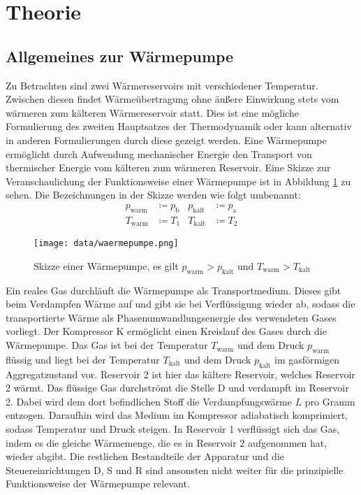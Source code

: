 \section{Theorie}
\label{sec:Theorie}
\subsection{Allgemeines zur Wärmepumpe}
Zu Betrachten sind zwei Wärmereservoirs mit verschiedener Temperatur.
Zwischen diesen findet Wärmeübertragung ohne äußere Einwirkung stets vom
wärmeren zum kälteren Wärmereservoir statt. Dies ist eine mögliche Formulierung des
zweiten Hauptsatzes der Thermodynamik oder kann alternativ in anderen Formulierungen
durch diese gezeigt werden. \newline
Eine Wärmepumpe ermöglicht durch Aufwendung mechanischer Energie den Transport von
thermischer Energie vom kälteren zum wärmeren Reservoir.
Eine Skizze zur Veranschaulichung der Funktionsweise einer Wärmepumpe ist in
Abbildung \ref{fig:waermepumpebild} zu sehen. Die Bezeichnungen in der Skizze werden
wie folgt umbenannt:
\begin{align*}
p_\text{warm} &\coloneqq p_\text{b} & p_\text{kalt} &\coloneqq p_\text{a} \\
T_\text{warm} &\coloneqq T_1 & T_\text{kalt} &\coloneqq T_2
\end{align*}

\begin{figure}[H]
  \centering
  \texttt{[image: data/waermepumpe.png]}
  \caption{Skizze einer Wärmepumpe, es gilt $p_\text{warm} > p_\text{kalt}$ und $T_\text{warm} > T_\text{kalt}$ \cite{Versuchsanleitung}}
  \label{fig:waermepumpebild}
\end{figure}

Ein reales Gas durchläuft die Wärmepumpe als Transportmedium. Dieses gibt beim Verdampfen
Wärme auf und gibt sie bei Verflüssigung wieder ab, sodass die transportierte Wärme
als Phasenumwandlungsenergie des verwendeten Gases vorliegt. Der Kompressor K ermöglicht
einen Kreislauf des Gases durch die Wärmepumpe. Das Gas ist bei der Temperatur $T_\text{warm}$
und dem Druck $p_\text{warm}$ flüssig und liegt bei der Temperatur $T_\text{kalt}$ und dem
Druck $p_\text{kalt}$ im gasförmigen Aggregatzustand vor. Reservoir 2 ist hier das
kältere Reservoir, welches Reservoir 2 wärmt. Das flüssige Gas durchströmt die Stelle D
und verdampft im Reservoir 2. Dabei wird dem dort befindlichen Stoff die Verdampfungswärme
$L$ pro Gramm entzogen. Daraufhin wird das Medium im Kompressor adiabatisch komprimiert,
sodass Temperatur und Druck steigen. In Reservoir 1 verflüssigt sich das Gas, indem es
die gleiche Wärmemenge, die es in Reservoir 2 aufgenommen hat, wieder abgibt.
Die restlichen Bestandteile der Apparatur und die Steuereinrichtungen D, S und R sind
ansonsten nicht weiter für die prinzipielle Funktionsweise der Wärmepumpe relevant.

